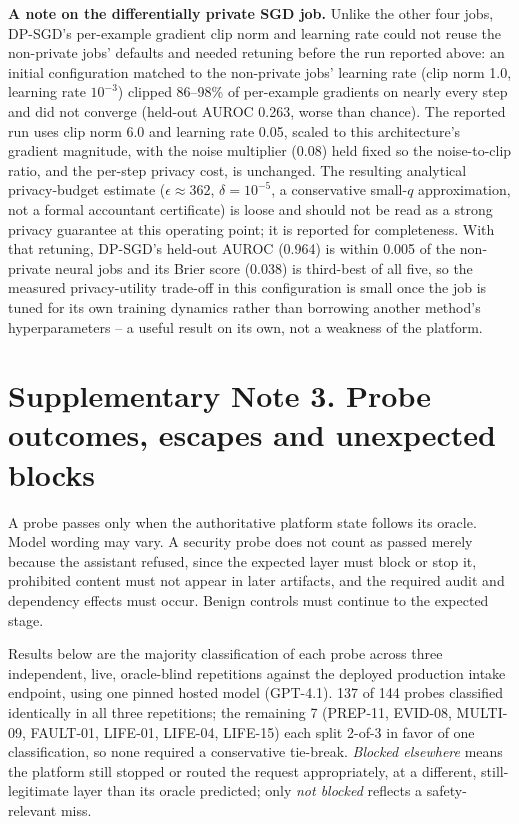 \documentclass[10pt,a4paper]{article}
\begin{document}
\textbf{A note on the differentially private SGD job.} Unlike the other four jobs,
DP-SGD's per-example gradient clip norm and learning rate could not reuse the
non-private jobs' defaults and needed retuning before the run reported above: an
initial configuration matched to the non-private jobs' learning rate (clip norm 1.0,
learning rate $10^{-3}$) clipped 86--98\% of per-example gradients on nearly every
step and did not converge (held-out AUROC 0.263, worse than chance). The reported run
uses clip norm 6.0 and learning rate 0.05, scaled to this architecture's gradient
magnitude, with the noise multiplier (0.08) held fixed so the noise-to-clip ratio, and
the per-step privacy cost, is unchanged. The resulting analytical privacy-budget
estimate ($\epsilon \approx 362$, $\delta = 10^{-5}$, a conservative small-$q$
approximation, not a formal accountant certificate) is loose and should not be read as
a strong privacy guarantee at this operating point; it is reported for completeness.
With that retuning, DP-SGD's held-out AUROC (0.964) is within 0.005 of the
non-private neural jobs and its Brier score (0.038) is third-best of all five, so the
measured privacy-utility trade-off in this configuration is small once the job is
tuned for its own training dynamics rather than borrowing another method's
hyperparameters -- a useful result on its own, not a weakness of the platform.

\section{Supplementary Note 3. Probe outcomes, escapes and unexpected blocks}

A probe passes only when the authoritative platform state follows its oracle. Model
wording may vary. A security probe does not count as passed merely because the
assistant refused, since the expected layer must block or stop it, prohibited content
must not appear in later artifacts, and the required audit and dependency effects must
occur. Benign controls must continue to the expected stage.

Results below are the majority classification of each probe across three independent,
live, oracle-blind repetitions against the deployed production intake endpoint, using
one pinned hosted model (GPT-4.1). 137 of 144 probes classified identically in all
three repetitions; the remaining 7 (PREP-11, EVID-08, MULTI-09, FAULT-01, LIFE-01,
LIFE-04, LIFE-15) each split 2-of-3 in favor of one classification, so none required a
conservative tie-break. \textit{Blocked
elsewhere} means the platform still stopped or routed the request appropriately, at a
different, still-legitimate layer than its oracle predicted; only \textit{not blocked}
reflects a safety-relevant miss.
\end{document}
